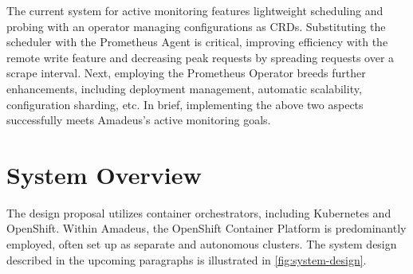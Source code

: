 The current system for active monitoring features lightweight scheduling and probing with an operator managing configurations as \ac{CRD}s. Substituting the scheduler with the Prometheus Agent is critical, improving efficiency with the remote write feature and decreasing peak requests by spreading requests over a scrape interval. Next, employing the Prometheus Operator breeds further enhancements, including deployment management, automatic scalability, configuration sharding, etc. In brief, implementing the above two aspects successfully meets Amadeus's active monitoring goals. 

\section{System Overview}

The design proposal utilizes container orchestrators, including Kubernetes and OpenShift. Within Amadeus, the OpenShift Container Platform is predominantly employed, often set up as separate and autonomous clusters. The system design described in the upcoming paragraphs is illustrated in \autoref{fig:system-design}. 

